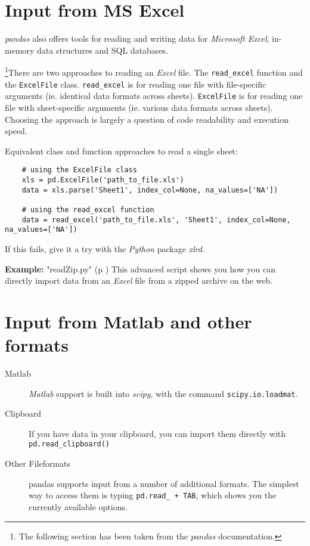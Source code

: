 \section{Input from MS Excel}

\emph{pandas} also offers tools for reading and writing data for \emph{Microsoft Excel}, in-memory data structures and SQL databases.

\footnote{The following section has been taken from the \emph{pandas} documentation.}There are two approaches to reading an \emph{Excel} file. The \lstinline{read_excel} function and the \lstinline{ExcelFile} class. \lstinline{read_excel} is for reading one file with file-specific arguments (ie. identical data formats across sheets). \lstinline{ExcelFile} is for reading one file with sheet-specific arguments (ie. various data formats across sheets). Choosing the approach is largely a question of code readability and execution speed.

Equivalent class and function approaches to read a single sheet:

\begin{lstlisting}
    # using the ExcelFile class
    xls = pd.ExcelFile('path_to_file.xls')
    data = xls.parse('Sheet1', index_col=None, na_values=['NA'])

    # using the read_excel function
    data = read_excel('path_to_file.xls', 'Sheet1', index_col=None, na_values=['NA'])
\end{lstlisting}

If this fails, give it a try with the \emph{Python} package \emph{xlrd}.

\textbf{Example: }
\PyImg "readZip.py" (p \pageref{py:readZip}) This advanced script shows you how you can directly import data from an \emph{Excel} file from a zipped archive on the web.

\section{Input from Matlab and other formats}

\begin{description}
  \item[Matlab] \emph{Matlab} support is built into \emph{scipy}, with the command \lstinline{scipy.io.loadmat}.
  \item[Clipboard] If you have data in your clipboard, you can import them directly with \lstinline{pd.read_clipboard()}
  \item[Other Fileformats] pandas supports input from a number of additional formats. The simplest way to access them is typing \lstinline{pd.read_ + TAB}, which shows you the currently available options.
\end{description}

